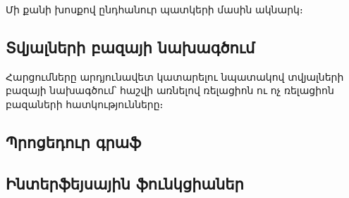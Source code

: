 {
Մի քանի խոսքով ընդհանուր պատկերի մասին ակնարկ։

\subsection{Տվյալների  բազայի նախագծում}
Հարցումները արդյունավետ կատարելու նպատակով տվյալների  բազայի նախագծում՝ հաշվի առնելով ռելացիոն ու ոչ ռելացիոն բազաների հատկությունները։

\subsection{Պրոցեդուր գրաֆ}


\subsection{Ինտերֆեյսային ֆունկցիաներ}
}
